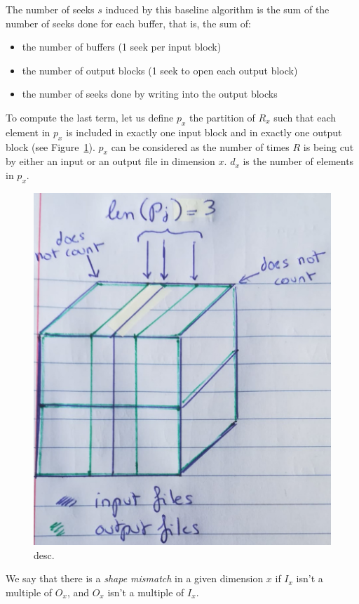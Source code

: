 \documentclass[conference]{IEEEtran}
\begin{document}
The number of seeks $s$ induced by this baseline algorithm is the
sum of the number of seeks done for each buffer, that is, the sum of:
\begin{itemize}
  \item the number of buffers (1 seek per input block)
  \item the number of output blocks (1 seek to open each output block)
  \item the number of seeks done by writing into the output blocks
\end{itemize}
To compute the last term, let us define $p_x$ the partition of $R_x$
such that each element in $p_x$ is included in exactly one input block and in
exactly one output block (see Figure~\ref{fig:p}). $p_x$ can be considered as
the number of times $R$ is being cut by either an input or an output file in
dimension $x$. $d_x$ is the number of elements in $p_x$.
\begin{figure}[h]
  \centering
  \includegraphics[scale=0.15]{./figures/new/p.jpeg}
  \caption{desc.}
  \label{fig:p}
  \end{figure}

We say that there is a \emph{shape mismatch} in a given dimension $x$ if $I_x$
isn't a multiple of $O_x$, and $O_x$ isn't a multiple of $I_x$.
\end{document}
